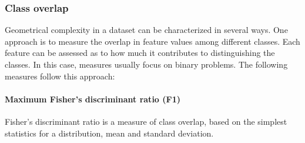 \documentclass[
	fontsize=11pt, %
	twoside=false, %
	open=any, %
	secnumdepth=1, %
]{kaobook}
\newcommand{\change}[1]{{\color{blue}#1}}
\renewcommand{\change}[1]{#1}
\begin{document}
\subsubsection{Class overlap}

Geometrical complexity in a dataset can be characterized in several ways. One approach is to measure the overlap in feature values among different classes. Each feature can be assessed as to how much it contributes to distinguishing the classes. In this case, measures usually focus on binary problems. \change{The following measures follow this approach}:

\paragraph*{Maximum Fisher's discriminant ratio (F1)}
Fisher's discriminant ratio is a measure of class overlap, based on the simplest statistics for a distribution, mean and standard deviation. {}
\end{document}
